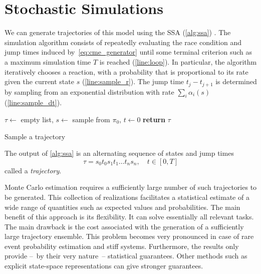 \section{Stochastic Simulations}\label{sec:ssa}
We can generate trajectories of this model using the \acf{SSA} (\autoref{alg:ssa})  \parencite{gillespie1977exact}.
The simulation algorithm consists of repeatedly evaluating the race condition and jump times induced by~\eqref{eq:cme_generator} until some terminal criterion such as a maximum simulation time $T$ is reached (\autoref{line:loop}).
In particular, the algorithm iteratively chooses a reaction, with a probability that is
proportional to its rate given the current state $s$ (\autoref{line:sample_r}).
The jump time $t_j- t_{j+1}$ is determined by sampling from an exponential distribution with rate $\sum_i\alpha_i(s)$ (\autoref{line:sample_dt}).
\begin{algorithm}
    $\tau \leftarrow$ empty list, $s\leftarrow$ sample from $\pi_0$, $t\leftarrow 0$\;
    \textbf{return} $\tau$\;
    \caption{\label{alg:ssa}Sample a trajectory}
\end{algorithm}

The output of \autoref{alg:ssa} is an alternating sequence of states and jump times
\[
    \tau = s_0t_0s_1t_1\dots t_n s_n, \quad t\in[0,T]
\]
called a \emph{trajectory}.

Monte Carlo estimation requires a sufficiently large number of such trajectories to
be generated.
This collection of realizations facilitates a statistical estimate of
a wide range of quantities such as expected values and probabilities.
The main benefit of this approach is its flexibility.
It can solve essentially all relevant tasks.
The main drawback is the cost associated with the generation of a sufficiently large trajectory ensemble.
This problem becomes very pronounced in case of rare event probability estimation and stiff systems.
Furthermore, the results only provide --~by their very nature~-- statistical guarantees.
Other methods such as explicit state-space representations can give stronger guarantees.


